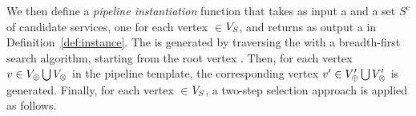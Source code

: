     We then define a \emph{pipeline instantiation} function that takes as input a \pipelineTemplate \tChartFunction and a set $S^c$ of candidate services, one for each vertex $\in$$V_S$, and returns as output a \pipelineInstance \iChartFunction in Definition~\ref{def:instance}.
    The \pipelineInstance  is generated by traversing the \pipelineTemplate with a breadth-first search algorithm, starting from the root vertex .
    Then, for each vertex $v\in V_{\oplus}\bigcup V_{\otimes}$ in the pipeline template, the corresponding vertex $v'\in V'_{\oplus}\bigcup V'_{\otimes}$ is generated.
    Finally, for each vertex $\in$$V_S$, a two-step selection approach is applied as follows.

